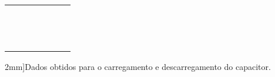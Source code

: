 \begin{table*}
\begin{center}
\begin{tabular}{lp{25mm}p{25mm}lp{25mm}p{25mm}l}
		& \cellcolor[gray]{0.89} & \cellcolor[gray]{0.92} & & \cellcolor[gray]{0.89} & \cellcolor[gray]{0.92} & \\
		& \cellcolor[gray]{0.95} & \cellcolor[gray]{0.97} & & \cellcolor[gray]{0.95} & \cellcolor[gray]{0.97} & \\
		& \cellcolor[gray]{0.89} & \cellcolor[gray]{0.92} & & \cellcolor[gray]{0.89} & \cellcolor[gray]{0.92} & \\
		& \cellcolor[gray]{0.95} & \cellcolor[gray]{0.97} & & \cellcolor[gray]{0.95} & \cellcolor[gray]{0.97} & \\
		& \cellcolor[gray]{0.89} & \cellcolor[gray]{0.92} & & \cellcolor[gray]{0.89} & \cellcolor[gray]{0.92} & \\
		& \cellcolor[gray]{0.95} & \cellcolor[gray]{0.97} & & \cellcolor[gray]{0.95} & \cellcolor[gray]{0.97} & \\
		& \cellcolor[gray]{0.89} & \cellcolor[gray]{0.92} & & \cellcolor[gray]{0.89} & \cellcolor[gray]{0.92} & \\
		& \cellcolor[gray]{0.95} & \cellcolor[gray]{0.97} & & \cellcolor[gray]{0.95} & \cellcolor[gray]{0.97} & \\
		& \cellcolor[gray]{0.89} & \cellcolor[gray]{0.92} & & \cellcolor[gray]{0.89} & \cellcolor[gray]{0.92} & \\
		& \cellcolor[gray]{0.95} & \cellcolor[gray]{0.97} & & \cellcolor[gray]{0.95} & \cellcolor[gray]{0.97} & \\
		& \cellcolor[gray]{0.89} & \cellcolor[gray]{0.92} & & \cellcolor[gray]{0.89} & \cellcolor[gray]{0.92} & \\
		& \cellcolor[gray]{0.95} & \cellcolor[gray]{0.97} & & \cellcolor[gray]{0.95} & \cellcolor[gray]{0.97} & \\
		& \cellcolor[gray]{0.89} & \cellcolor[gray]{0.92} & & \cellcolor[gray]{0.89} & \cellcolor[gray]{0.92} & \\
\bottomrule
		\end{tabular}
	\caption[][2mm]{Dados obtidos para o carregamento e descarregamento do capacitor.}\label{Tab:CargaEDescargaCapacitor}
	\end{center}
\end{table*}

